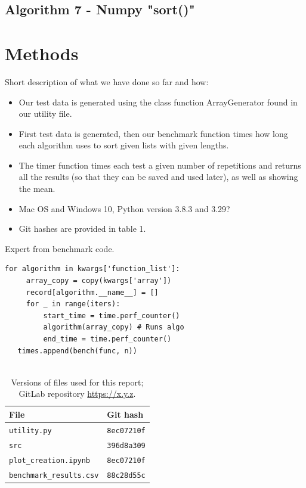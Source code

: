 \documentclass[sigconf, nonacm, natbib, screen, balance=False]{acmart}
\begin{document}
\subsection{Algorithm 7 - Numpy "sort()" }\label{sec:algo2}

\section{Methods}\label{sec:methods}

Short description of what we have done so far and how:
\begin{itemize}
\item Our test data is generated using the class function ArrayGenerator found in our utility file.
\item First test data is generated, then our benchmark function times how long each algorithm uses to sort given lists with given lengths.  
\item The timer function times each test a given number of repetitions and returns all the results (so that they can be saved and used later), as well as showing the mean.
\item Mac OS and Windows 10, Python version 3.8.3 and 3.29?
\item Git hashes are provided in table 1.
\end{itemize}

\begin{listing}
  \caption{Expert from benchmark code.}
  \label{lst:bench_setup}
  \begin{lstlisting}
for algorithm in kwargs['function_list']:
     array_copy = copy(kwargs['array'])
     record[algorithm.__name__] = []
     for _ in range(iters):
         start_time = time.perf_counter()
         algorithm(array_copy) # Runs algo
         end_time = time.perf_counter()
   times.append(bench(func, n))
   
  \end{lstlisting}
\end{listing}

\begin{table}
  \caption{Versions of files used for this report; GitLab repository
    \url{https://x.y.z}.}
  \label{tab:hashes}
  \begin{tabular}{ll}
    \hline
    File & Git hash \\\hline
    \verb!utility.py! & \verb!8ec07210f! \\
    \verb!src! & \verb!396d8a309! \\
    \verb!plot_creation.ipynb! & \verb!8ec07210f! \\
    \verb!benchmark_results.csv! & \verb!88c28d55c! \\\hline
  \end{tabular}
\end{table}
\end{document}
